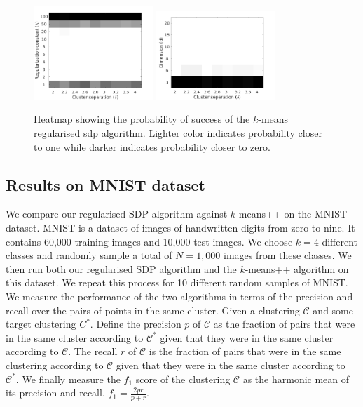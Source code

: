 \documentclass[12pt]{article}
\newcommand{\mc}{\mathcal}
\begin{document}
\begin{figure}[t]
  \label{figure:simulation}
  \centering
  \includegraphics[width=0.4\textwidth]{figures/optimizationClustering/deltaLambda.png}
  \includegraphics[width=0.4\textwidth]{figures/optimizationClustering/deltaD.png}
  \caption{Heatmap showing the probability of success of the $k$-means regularised sdp algorithm. Lighter color indicates probability closer to one while darker indicates probability closer to zero.}  
\end{figure}

\subsection{Results on MNIST dataset}
We compare our regularised SDP algorithm against $k$-means++ on the MNIST dataset. MNIST is a dataset of images of handwritten digits from zero to nine. It contains 60,000 training images and 10,000 test images. We choose $k = 4$ different classes and randomly sample a total of $N = 1,000$ images from these classes.  We then run both our regularised SDP algorithm and the $k$-means++ algorithm on this dataset. We repeat this process for 10 different random samples of MNIST. We measure the performance of the two algorithms in terms of the precision and recall over the pairs of points in the same cluster. Given a clustering $\mc C$ and some target clustering $C^*$. Define the precision $p$ of $\mc C$ as the fraction of pairs that were in the same cluster according to $\mc C^*$ given that they were in the same cluster according to $\mc C$. The recall $r$ of $\mc C$ is the fraction of pairs that were in the same clustering according to $\mc C$ given that they were in the same cluster according to $\mc C^*$. We finally measure the $f_1$ score of the clustering $\mc C$ as the harmonic mean of its precision and recall. $f_1 = \frac{2pr}{p+r}$. 
\end{document}
